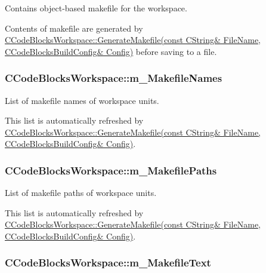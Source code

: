 Contains object-\/based makefile for the workspace. 

Contents of makefile are generated by \hyperlink{classCCodeBlocksWorkspace_a2057d5876c3e450b04295066dcaef035}{C\-Code\-Blocks\-Workspace\-::\-Generate\-Makefile(const C\-String\& File\-Name, C\-Code\-Blocks\-Build\-Config\& Config)} before saving to a file. \hypertarget{classCCodeBlocksWorkspace_a6d068259798bb7878ebbac957cdc8c58}{
\subsubsection[{m\-\_\-\-Makefile\-Names}]{\setlength{\rightskip}{0pt plus 5cm}C\-Code\-Blocks\-Workspace\-::m\-\_\-\-Makefile\-Names\hspace{0.3cm}{\ttfamily [private]}}}\label{classCCodeBlocksWorkspace_a6d068259798bb7878ebbac957cdc8c58}


List of makefile names of workspace units. 

This list is automatically refreshed by \hyperlink{classCCodeBlocksWorkspace_a2057d5876c3e450b04295066dcaef035}{C\-Code\-Blocks\-Workspace\-::\-Generate\-Makefile(const C\-String\& File\-Name, C\-Code\-Blocks\-Build\-Config\& Config)}. \hypertarget{classCCodeBlocksWorkspace_aa1b3293bb2f0a1ae7783bb645f216f62}{
\subsubsection[{m\-\_\-\-Makefile\-Paths}]{\setlength{\rightskip}{0pt plus 5cm}C\-Code\-Blocks\-Workspace\-::m\-\_\-\-Makefile\-Paths\hspace{0.3cm}{\ttfamily [private]}}}\label{classCCodeBlocksWorkspace_aa1b3293bb2f0a1ae7783bb645f216f62}


List of makefile paths of workspace units. 

This list is automatically refreshed by \hyperlink{classCCodeBlocksWorkspace_a2057d5876c3e450b04295066dcaef035}{C\-Code\-Blocks\-Workspace\-::\-Generate\-Makefile(const C\-String\& File\-Name, C\-Code\-Blocks\-Build\-Config\& Config)}. \hypertarget{classCCodeBlocksWorkspace_a95da319fd45ea58130eb821412f268ce}{
\subsubsection[{m\-\_\-\-Makefile\-Text}]{\setlength{\rightskip}{0pt plus 5cm}C\-Code\-Blocks\-Workspace\-::m\-\_\-\-Makefile\-Text\hspace{0.3cm}{\ttfamily [private]}}}\label{classCCodeBlocksWorkspace_a95da319fd45ea58130eb821412f268ce}


